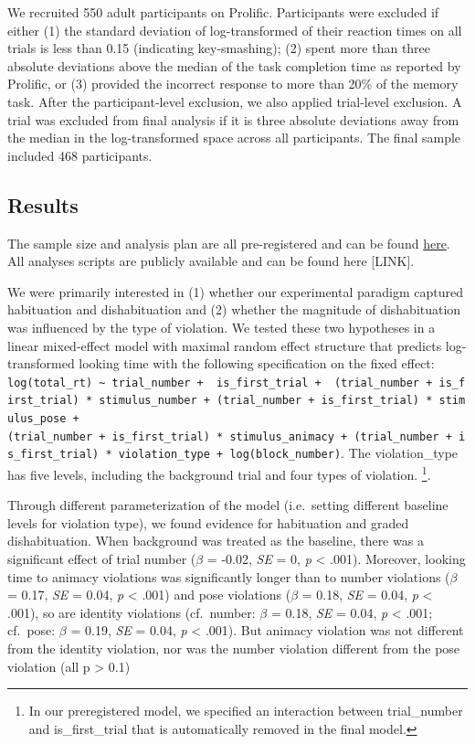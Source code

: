 \documentclass[10pt, letterpaper]{article}
\begin{document}
We recruited 550 adult participants on Prolific. Participants were
excluded if either (1) the standard deviation of log-transformed of
their reaction times on all trials is less than 0.15 (indicating
key-smashing); (2) spent more than three absolute deviations above the
median of the task completion time as reported by Prolific, or (3)
provided the incorrect response to more than 20\% of the memory task.
After the participant-level exclusion, we also applied trial-level
exclusion. A trial was excluded from final analysis if it is three
absolute deviations away from the median in the log-transformed space
across all participants. The final sample included 468 participants.

\hypertarget{results}{%
\subsection{Results}\label{results}}

The sample size and analysis plan are all pre-registered and can be
found \href{https://aspredicted.org/blind.php?x=WGF_J7K}{here}. All
analyses scripts are publicly available and can be found here
{[}LINK{]}.

We were primarily interested in (1) whether our experimental paradigm
captured habituation and dishabituation and (2) whether the magnitude of
dishabituation was influenced by the type of violation. We tested these
two hypotheses in a linear mixed-effect model with maximal random effect
structure that predicts log-transformed looking time with the following
specification on the fixed effect:
\texttt{log(total\_rt)\ \textasciitilde{}\ trial\_number\ +\ \ is\_first\_trial\ +\ \ (trial\_number\ +\ is\_first\_trial)\ *\ stimulus\_number\ +\ (trial\_number\ +\ is\_first\_trial)\ *\ stimulus\_pose\ +(trial\_number\ +\ is\_first\_trial)\ *\ stimulus\_animacy\ +\ (trial\_number\ +\ is\_first\_trial)\ *\ violation\_type\ +\ log(block\_number)}.
The violation\_type has five levels, including the background trial and
four types of violation. \footnote{In our preregistered model, we
  specified an interaction between trial\_number and is\_first\_trial
  that is automatically removed in the final model.}.

Through different parameterization of the model (i.e.~setting different
baseline levels for violation type), we found evidence for habituation
and graded dishabituation. When background was treated as the baseline,
there was a significant effect of trial number (\(\beta\) = -0.02,
\emph{SE} = 0, \emph{p} \textless{} .001). Moreover, looking time to
animacy violations was significantly longer than to number violations
(\(\beta\) = 0.17, \emph{SE} = 0.04, \emph{p} \textless{} .001) and pose
violations (\(\beta\) = 0.18, \emph{SE} = 0.04, \emph{p} \textless{}
.001), so are identity violations (cf.~number: \(\beta\) = 0.18,
\emph{SE} = 0.04, \emph{p} \textless{} .001; cf.~pose: \(\beta\) = 0.19,
\emph{SE} = 0.04, \emph{p} \textless{} .001). But animacy violation was
not different from the identity violation, nor was the number violation
different from the pose violation (all p \textgreater{} 0.1)
\end{document}
